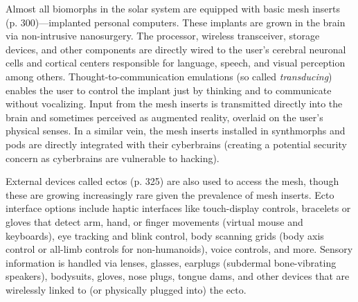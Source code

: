 Almost all biomorphs in the solar system are equipped 
with basic mesh inserts (p. 300)—implanted personal 
computers. These implants are grown in the brain via 
non-intrusive nanosurgery. The processor, wireless 
transceiver, storage devices, and other components 
are directly wired to the user's cerebral neuronal cells 
and cortical centers responsible for language, speech, 
and visual perception among others. Thought-to-communication
emulations (so called \textit{transducing})
enables the user to control the implant just by thinking
and to communicate without vocalizing. Input
from the mesh inserts is transmitted directly into the 
brain and sometimes perceived as augmented reality, 
overlaid on the user's physical senses. In a similar 
vein, the mesh inserts installed in synthmorphs and 
pods are directly integrated with their cyberbrains 
(creating a potential security concern as cyberbrains 
are vulnerable to hacking).

External devices called ectos (p. 325) are also 
used to access the mesh, though these are growing 
increasingly rare given the prevalence of mesh inserts. 
Ecto interface options include haptic interfaces like 
touch-display controls, bracelets or gloves that detect 
arm, hand, or finger movements (virtual mouse and 
keyboards), eye tracking and blink control, body 
scanning grids (body axis control or all-limb controls 
for non-humanoids), voice controls, and more. Sensory
information is handled via lenses, glasses, earplugs
(subdermal bone-vibrating speakers), bodysuits,
gloves, nose plugs, tongue dams, and other devices 
that are wirelessly linked to (or physically plugged 
into) the ecto.

